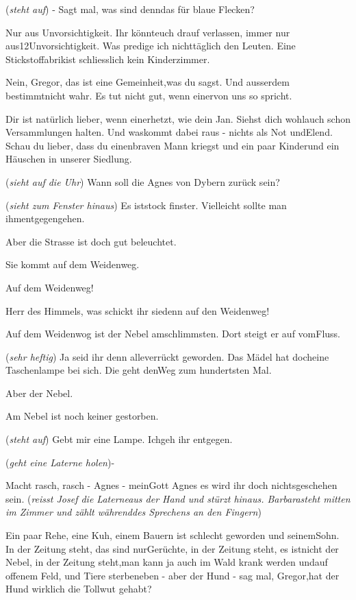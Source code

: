 \documentclass[
	final,
	a4paper,
	ngerman,
	mpinclude = true, %
	twoside = true,
	open = right,
	cleardoublepage = plain,
	DIV = 13,
	BCOR = 1cm,
	titlepage = firstiscover,
	]{scrbook}
\newcommand{\direction}[1]{(\textit{#1})}
\newcommand{\thecharacter}[1]{\textup{\textsc{#1}}\xspace}
\newcommand{\theBarbara}{\thecharacter{Barbara}}
\newcommand{\theJosef}{\thecharacter{Josef}}
\newcommand{\theGregor}{\thecharacter{Gregor}}
\newcommand{\theJan}{\thecharacter{Jan}}
\newcommand{\theAndreas}{\thecharacter{Andreas}}
\newcommand{\theLuise}{\thecharacter{Luise}}
\newcommand{\character}[1]{\item[#1]}
\newcommand{\Barbara}{\character{\theBarbara}}
\newcommand{\Josef}{\character{\theJosef}}
\newcommand{\Gregor}{\character{\theGregor}}
\newcommand{\Jan}{\character{\theJan}}
\newcommand{\Andreas}{\character{\theAndreas}}
\newcommand{\Luise}{\character{\theLuise}}
\begin{document}
\begin{play}
\Barbara
\direction{steht auf} - Sagt mal, was sind denndas für blaue Flecken?

\Gregor
Nur aus Unvorsichtigkeit. Ihr könnteuch drauf verlassen, immer nur aus12Unvorsichtigkeit. Was predige ich nichttäglich den Leuten. Eine Stickstoffabrikist schliesslich kein Kinderzimmer.

\Luise
Nein, Gregor, das ist eine Gemeinheit,was du sagst. Und ausserdem bestimmtnicht wahr. Es tut nicht gut, wenn einervon uns so spricht.

\Gregor
Dir ist natürlich lieber, wenn einerhetzt, wie dein Jan. Siehst dich wohlauch schon Versammlungen halten. Und waskommt dabei raus - nichts als Not undElend. Schau du lieber, dass du einenbraven Mann kriegst und ein paar Kinderund ein Häuschen in unserer Siedlung.

\Andreas
\direction{sieht auf die Uhr} Wann soll die Agnes von Dybern zurück sein?

\Josef
\direction{sieht zum Fenster hinaus} Es iststock finster. Vielleicht sollte man ihmentgegengehen.

\Luise
Aber die Strasse ist doch gut beleuchtet.

\Barbara
Sie kommt auf dem Weidenweg.

\Andreas
Auf dem Weidenweg!

\Jan
Herr des Himmels, was schickt ihr siedenn auf den Weidenweg!

\Gregor
Auf dem Weidenwog ist der Nebel amschlimmsten. Dort steigt er auf vomFluss.

\Barbara
\direction{sehr heftig} Ja seid ihr denn alleverrückt geworden. Das Mädel hat docheine Taschenlampe bei sich. Die geht denWeg zum hundertsten Mal.

\Luise
Aber der Nebel.

\Barbara
Am Nebel ist noch keiner gestorben.

\Andreas
\direction{steht auf} Gebt mir eine Lampe. Ichgeh ihr entgegen.

\Josef
\direction{geht eine Laterne holen}-

\Andreas
Macht rasch, rasch - Agnes - meinGott Agnes es wird ihr doch nichtsgeschehen sein. \direction{reisst Josef die Laterneaus der Hand und stürzt hinaus. Barbarasteht mitten im Zimmer und zählt währenddes Sprechens an den Fingern}

\Barbara
Ein paar Rehe, eine Kuh, einem Bauern ist schlecht geworden und seinemSohn. In der Zeitung steht, das sind nurGerüchte, in der Zeitung steht, es istnicht der Nebel, in der Zeitung steht,man kann ja auch im Wald krank werden undauf offenem Feld, und Tiere sterbeneben - aber der Hund - sag mal, Gregor,hat der Hund wirklich die Tollwut gehabt?


\end{play}
\end{document}
